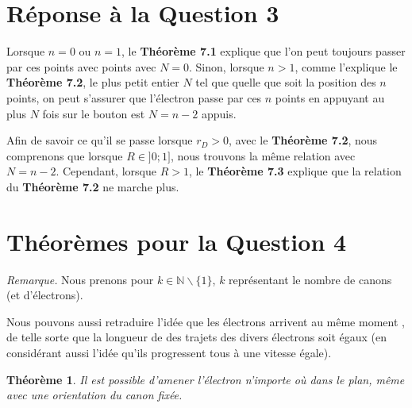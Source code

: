 \documentclass{amsart}
\newtheorem{theorem}{Théorème}[section]
\theoremstyle{definition}
\theoremstyle{remark}
\numberwithin{equation}{section}
\begin{document}
\section{Réponse à la Question 3}

Lorsque $n=0$ ou $n=1$, le \textbf{Théorème 7.1} explique que l'on peut toujours passer par ces points avec points avec $N=0$.
Sinon, lorsque $n>1$, comme l'explique le \textbf{Théorème 7.2}, le plus petit entier $N$ tel que quelle que soit la position des $n$ points, on peut s’assurer que l’électron passe par ces $n$ points en appuyant
au plus $N$ fois sur le bouton est $N=n-2$ appuis. 

Afin de savoir ce qu'il se passe lorsque $r_D>0$, avec le \textbf{Théorème 7.2}, nous comprenons que lorsque $R\in]0;1]$, nous trouvons la même relation avec $N=n-2$. Cependant, lorsque $R>1$, le \textbf{Théorème 7.3} 
explique que la relation du \textbf{Théorème 7.2} ne marche plus.

\section{Théorèmes pour la Question 4}

\textit{Remarque.} Nous prenons pour $k\in\mathbb{N}\backslash\lbrace{1}\rbrace$, $k$ représentant le nombre de canons (et d'électrons). 

Nous pouvons aussi retraduire l'idée que les électrons arrivent \og au même moment \fg{}, de telle sorte que la longueur de des trajets des divers électrons soit égaux (en considérant aussi l'idée qu'ils progressent tous à une vitesse égale).

\begin{theorem}
  Il est possible d'amener l'électron n'importe où dans le plan, même avec une orientation du canon fixée.
\end{theorem}
\end{document}
